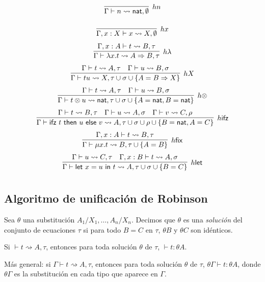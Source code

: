 \documentclass[twoside,a4paper,12pt]{article}
\theoremstyle{definition}
\theoremstyle{remark}
\begin{document}
\[\arraycolsep=10pt\def\arraystretch{2.6}
  \begin{array}{cc}
  \infer[hn]{\Gamma\vdash n\rightsquigarrow\nat,\emptyset}{} \\
  \infer[hx]{\Gamma,x:X\vdash x\rightsquigarrow X,\emptyset}{} \\
  \infer[h\lambda]
      {\Gamma\vdash\fun xt\rightsquigarrow A\Rightarrow B,\tau}
      {\Gamma,x:A\vdash t\rightsquigarrow B,\tau} \\
  \infer[hX]
      {\Gamma\vdash tu\rightsquigarrow X,\tau\cup\sigma\cup\{A=B\Rightarrow X\}}
      {\Gamma\vdash t\rightsquigarrow A,\tau & \Gamma\vdash u\rightsquigarrow B,\sigma } \\
  \infer[h\otimes]
      {\Gamma\vdash t\otimes u\rightsquigarrow\nat,\tau\cup\sigma\cup\{A=\nat,B=\nat\}}
      {\Gamma\vdash t\rightsquigarrow A,\tau & \Gamma\vdash u\rightsquigarrow B,\sigma } \\
  \infer[h\mathsf{ifz}]
      {\Gamma\vdash\ifz tuv\rightsquigarrow A,\tau\cup\sigma\cup\rho\cup\{B=\nat,A=C\}}
      {   \Gamma\vdash t\rightsquigarrow B,\tau
        & \Gamma\vdash u\rightsquigarrow A,\sigma
        & \Gamma\vdash v\rightsquigarrow C,\rho } \\
  \infer[h\mathsf{fix}]
      {\Gamma\vdash\fix xt\rightsquigarrow B,\tau\cup\{A=B\}}
      {\Gamma,x:A\vdash t\rightsquigarrow B,\tau} \\
  \infer[h\mathsf{let}]
      {\Gamma\vdash\letl xut\rightsquigarrow A,\tau\cup\sigma\cup\{B=C\}}
      {\Gamma\vdash u\rightsquigarrow C,\tau & \Gamma,x:B\vdash t\rightsquigarrow A,\sigma}
  \end{array}
\]
    
\subsection*{Algoritmo de unificación de Robinson}
\begin{definicion}
  Sea $\theta$ una substitución $A_1/X_1,\dots,A_n/X_n$. Decimos que $\theta$ es
  una \emph{solución} del conjunto de ecuaciones $\tau$ si para todo $B=C$ en
  $\tau$, $\theta B$ y $\theta C$ son idénticos.
\end{definicion}

\begin{teorema}
  Si $\vdash t\rightsquigarrow A,\tau$, entonces para toda solución $\theta$ de
  $\tau$, $\vdash t:\theta A$.

  Más general: si $\Gamma\vdash t\rightsquigarrow A,\tau$, entonces para toda
  solución $\theta$ de $\tau$, $\theta\Gamma\vdash t:\theta A$, donde
  $\theta\Gamma$ es la substitución en cada tipo que aparece en $\Gamma$.
\end{teorema}
\end{document}
